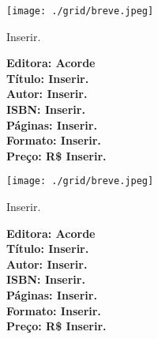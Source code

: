 \pagestyle{acorde}
\label{acorde}



\begin{center}
\hspace*{.5cm}\texttt{[image: ./grid/breve.jpeg]}
\end{center}

\hspace*{-7cm}\hrulefill\hspace*{-7cm}

\medskip

\noindent{}Inserir.

\vfill

\hspace*{-.4cm}\begin{minipage}[c]{.5\linewidth}
\small\textbf{
\hspace*{-.1cm}Editora: Acorde\\
Título: Inserir.\\
Autor: Inserir.\\ 
ISBN: Inserir.\\
Páginas: Inserir.\\
Formato: Inserir.\\
Preço: R\$ Inserir.\\
}
\end{minipage}

\pagebreak

\begin{center}
\hspace*{.5cm}\texttt{[image: ./grid/breve.jpeg]}
\end{center}

\hspace*{-7cm}\hrulefill\hspace*{-7cm}

\medskip

\noindent{}Inserir.

\vfill

\hspace*{-.4cm}\begin{minipage}[c]{.5\linewidth}
\small\textbf{
\hspace*{-.1cm}Editora: Acorde\\
Título: Inserir.\\
Autor: Inserir.\\ 
ISBN: Inserir.\\
Páginas: Inserir.\\
Formato: Inserir.\\
Preço: R\$ Inserir.\\
}
\end{minipage}

